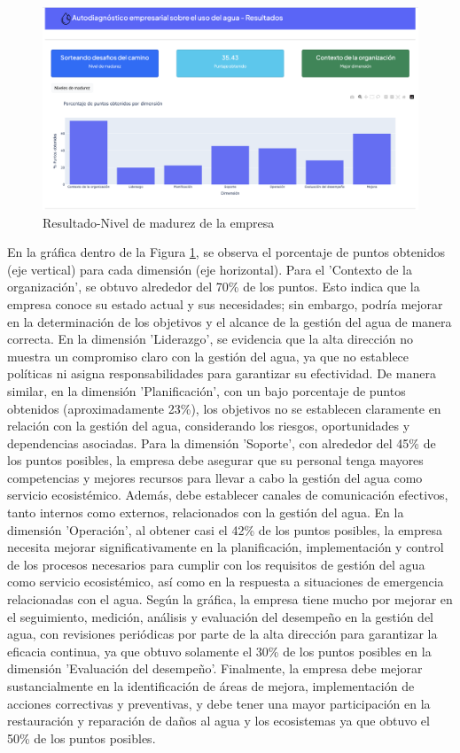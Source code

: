\begin{figure}[H]
        \centering
        \includegraphics[scale=0.25]{images/99-aplicacion-web/8-mm.png}
        \caption{Resultado-Nivel de madurez de la empresa}
        \label{fig:resultados-nivel-madurez}
\end{figure}

En la gráfica dentro de la Figura \ref{fig:resultados-nivel-madurez}, se observa el porcentaje de puntos obtenidos (eje vertical) para cada dimensión (eje horizontal). Para el 'Contexto de la organización', se obtuvo alrededor del 70\% de los puntos. Esto indica que la empresa conoce su estado actual y sus necesidades; sin embargo, podría mejorar en la determinación de los objetivos y el alcance de la gestión del agua de manera correcta. En la dimensión 'Liderazgo', se evidencia que la alta dirección no muestra un compromiso claro con la gestión del agua, ya que no establece políticas ni asigna responsabilidades para garantizar su efectividad. De manera similar, en la dimensión 'Planificación', con un bajo porcentaje de puntos obtenidos (aproximadamente 23\%), los objetivos no se establecen claramente en relación con la gestión del agua, considerando los riesgos, oportunidades y dependencias asociadas. Para la dimensión 'Soporte', con alrededor del 45\% de los puntos posibles, la empresa debe asegurar que su personal tenga mayores competencias y mejores recursos para llevar a cabo la gestión del agua como servicio ecosistémico. Además, debe establecer canales de comunicación efectivos, tanto internos como externos, relacionados con la gestión del agua. En la dimensión 'Operación', al obtener casi el 42\% de los puntos posibles, la empresa necesita mejorar significativamente en la planificación, implementación y control de los procesos necesarios para cumplir con los requisitos de gestión del agua como servicio ecosistémico, así como en la respuesta a situaciones de emergencia relacionadas con el agua. Según la gráfica, la empresa tiene mucho por mejorar en el seguimiento, medición, análisis y evaluación del desempeño en la gestión del agua, con revisiones periódicas por parte de la alta dirección para garantizar la eficacia continua, ya que obtuvo solamente el 30\% de los puntos posibles en la dimensión 'Evaluación del desempeño'. Finalmente, la empresa debe mejorar sustancialmente en la identificación de áreas de mejora, implementación de acciones correctivas y preventivas, y debe tener una mayor participación en la restauración y reparación de daños al agua y los ecosistemas ya que obtuvo el 50\% de los puntos posibles. 


